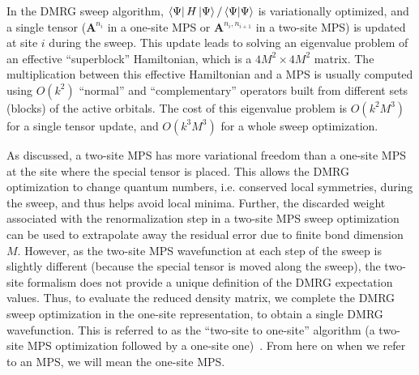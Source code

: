
In the DMRG sweep algorithm, $\bra{\Psi}H\ket{\Psi}/\braket{\Psi|\Psi}$ is variationally optimized, and  a single tensor ($\mathbf{A}^{n_i}$ in a one-site MPS or $\mathbf{A}^{n_i, n_{i+1}}$ in a  two-site MPS) is updated at site $i$ during the sweep. This update leads to solving an eigenvalue problem of an effective ``superblock'' Hamiltonian, 
which is a $4M^2\times 4M^2$ matrix. 
The multiplication between this effective Hamiltonian and a MPS is usually computed using $O(k^2)$ ``normal'' and ``complementary'' operators 
built from different sets (blocks) of the active orbitals. The cost of this eigenvalue problem is $O(k^2M^3)$ for a single tensor update, and $O(k^3M^3)$ 
for a whole sweep optimization. 

As discussed, a two-site MPS has more variational freedom than a one-site MPS at the site where the special tensor is placed. This allows 
the DMRG optimization to change quantum numbers, i.e. conserved local symmetries, during the sweep, and thus helps avoid local minima. Further,
the discarded weight associated with the renormalization step in a two-site MPS sweep optimization can be used to extrapolate away the residual 
error due to finite bond dimension $M$. 
However, as the two-site MPS wavefunction at each step of the sweep 
is slightly different (because the special tensor is moved along the sweep),
the two-site formalism does not provide a unique definition of the DMRG 
expectation values.
Thus, to evaluate the reduced density matrix, we complete the DMRG
sweep optimization in the one-site representation, to obtain a single 
DMRG wavefunction. This is
referred to as the ``two-site to one-site'' algorithm (a two-site MPS optimization followed by a one-site one)~\cite{olivares-amaya_ab-initio_2015}. 
From here on when we refer to an MPS, we will mean the one-site MPS.


